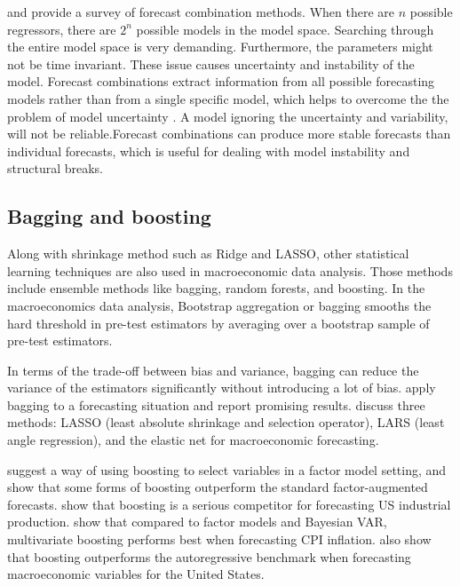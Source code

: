   and   provide  a survey of forecast combination methods. When there are $n$ possible regressors, there are $2^n$ possible models in the model space. Searching through the entire model space is very demanding. Furthermore, the parameters might not be time invariant. These issue causes uncertainty and instability of the model. Forecast combinations extract information from all possible forecasting models rather than from a single specific model, which helps to overcome the the problem of model uncertainty \cite{Andreou2013a}. A model ignoring the uncertainty and variability, will not be reliable.Forecast combinations can produce more stable forecasts than individual forecasts, which is useful for dealing with model instability and structural breaks.





\subsection{Bagging and boosting} 

Along with shrinkage method such as Ridge and LASSO, other statistical learning techniques are also used in macroeconomic data analysis. Those methods include ensemble methods like bagging, random forests, and boosting. In the macroeconomics data analysis, Bootstrap aggregation or bagging \cite{Breiman1996} smooths the hard threshold in pre-test estimators by averaging over a bootstrap sample of pre-test estimators.

In terms of the trade-off between bias and variance, bagging can reduce the variance of the estimators significantly without introducing a lot of bias.  apply bagging to a forecasting situation and report promising results.   discuss three methods: LASSO (least absolute shrinkage and selection operator), LARS (least angle regression), and the elastic net for macroeconomic forecasting.

  suggest a way of using boosting to select variables in a factor model setting, and show that some forms of boosting outperform the standard factor-augmented forecasts.  show that boosting is a serious competitor for forecasting US industrial production.   show that compared to factor models and Bayesian VAR, multivariate boosting performs best when forecasting CPI inflation.  also show that boosting outperforms the autoregressive benchmark when forecasting macroeconomic variables for the United States. 


\setlength{\unitlength}{\savedunitlength}